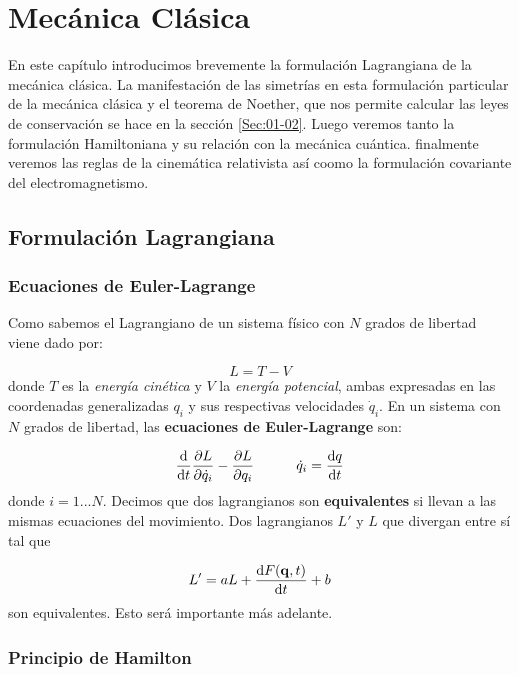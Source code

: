 \chapter{Mecánica Clásica}

En este capítulo introducimos brevemente la formulación Lagrangiana de la mecánica clásica. La manifestación de las simetrías en esta formulación particular de la mecánica clásica y el teorema de Noether, que nos permite calcular las leyes de conservación se hace en la sección \ref{Sec:01-02}. Luego veremos tanto la formulación Hamiltoniana y su relación con la mecánica cuántica. finalmente veremos las reglas de la cinemática relativista así coomo la formulación covariante del electromagnetismo. 

\section{Formulación Lagrangiana}

\subsection{Ecuaciones de Euler-Lagrange}

Como sabemos el Lagrangiano de un sistema físico con $N$ grados de libertad viene dado por:

\begin{equation}
	L = T - V
\end{equation}
donde $T$ es la \textit{energía cinética} y $V$ la \textit{energía potencial}, ambas expresadas en las coordenadas generalizadas $q_i$ y sus respectivas velocidades $\dot{q}_i$. En un sistema con $N$ grados de libertad, las \textbf{ecuaciones de Euler-Lagrange} son: 

\begin{equation}
	\frac{\mathrm{d} }{\mathrm{d} t} \frac{\partial L}{\partial \dot{q}_i} - \frac{\partial L}{\partial q_i} \quad \quad \quad \dot{q}_i = \frac{\mathrm{d} q}{\mathrm{d} t}
\end{equation} 
donde $i=1...N$. Decimos que dos lagrangianos son \textbf{equivalentes} si llevan a las mismas ecuaciones del movimiento. Dos lagrangianos $L'$ y $L$ que divergan entre sí tal que

\begin{equation}
	L' = aL  + \frac{\mathrm{d} F(\mathbf{q},t)}{\mathrm{d} t} + b
\end{equation} 
son equivalentes. Esto será importante más adelante.

\subsection{Principio de Hamilton}

